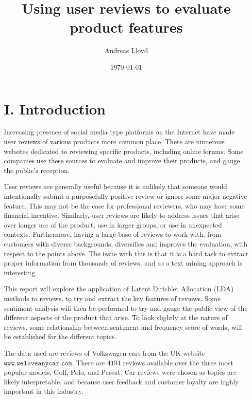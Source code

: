 \documentclass[onecolumn,prl,aps,10pt]{revtex4}
\begin{document}
\title{Using user reviews to evaluate product features}

\author{Andreas Lloyd}


\date{\today}

\maketitle

\section{I. Introduction}

Increasing presence of social media type platforms on the Internet have made user reviews of various products more common place. There are numerous websites dedicated to reviewing specific products, including online forums. Some companies use these sources to evaluate and improve their products, and gauge the public's reception.

User reviews are generally useful because it is unlikely that someone would intentionally submit a purposefully positive review or ignore some major negative feature. This may not be the case for professional reviewers, who may have some financial incentive. Similarly, user reviews are likely to address issues that arise over longer use of the product, use in larger groups, or use in unexpected contexts. Furthermore, having a large base of reviews to work with, from customers with diverse backgrounds, diversifies and improves the evaluation, with respect to the points above. The issue with this is that it is a hard task to extract proper information from thousands of reviews, and so a text mining approach is interesting. 

This report will explore the application of Latent Dirichlet Allocation (LDA) methods to reviews, to try and extract the key features of reviews. Some sentiment analysis will then be performed to try and gauge the public view of the different aspects of the product that arise. To look slightly at the nature of reviews, some relationship between sentiment and frequency score of words, will be established for the different topics.

The data used are reviews of Volkswagen cars from the UK website $\mathtt{www.weloveanycar.com}$. There are $4194$ reviews available over the three most popular models, Golf, Polo, and Passat. Car reviews were chosen as topics are likely interpretable, and because user feedback and customer loyalty are highly important in this industry.
\end{document}
